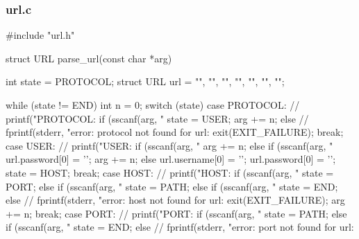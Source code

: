 \documentclass[11pt,a4paper,twocolumn]{article}
\begin{document}
\subsubsection{url.c}
\begin{c-darktheme}
    #include "url.h"

struct URL parse_url(const char *arg)
{
    int state = PROTOCOL;
    struct URL url = {"", "", "", "", "", "", ""};

    while (state != END)
    {
        int n = 0;
        switch (state)
        {
        case PROTOCOL:
            // printf("PROTOCOL: %
            if (sscanf(arg, "%
            {
                state = USER;
                arg += n;
            }
            else
            {
                // fprintf(stderr, "error: protocol not found for url: %
                exit(EXIT_FAILURE);
            }
            break;
        case USER:
            // printf("USER: %
            if (sscanf(arg, "%
            {
                arg += n;
            }
            else if (sscanf(arg, "%
            {
                url.password[0] = '\0';
                arg += n;
            }
            else
            {
                url.username[0] = '\0';
                url.password[0] = '\0';
            }
            state = HOST;
            break;
        case HOST:
            // printf("HOST: %
            if (sscanf(arg, "%
            {
                state = PORT;
            }
            else if (sscanf(arg, "%
            {
                state = PATH;
            }
            else if (sscanf(arg, "%
            {
                state = END;
            }
            else
            {
                // fprintf(stderr, "error: host not found for url: %
                exit(EXIT_FAILURE);
            }
            arg += n;
            break;
        case PORT:
            // printf("PORT: %
            if (sscanf(arg, "%
            {
                state = PATH;
            }
            else if (sscanf(arg, "%
            {
                state = END;
            }
            else
            {
                // fprintf(stderr, "error: port not found for url: %
}}}}
\end{c-darktheme}
\end{document}
